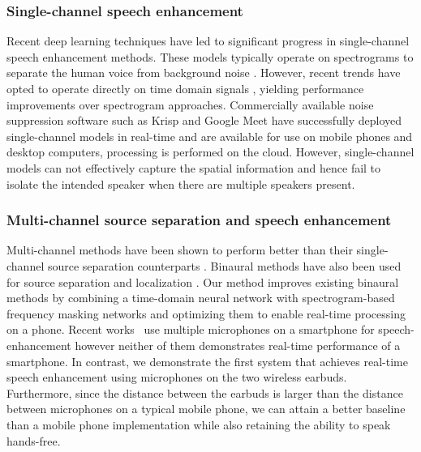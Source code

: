 \documentclass [11pt, proquest] {uwthesis}[2020/02/24]
\begin{document}
\subsubsection{Single-channel speech enhancement}
Recent deep learning techniques have led to significant progress in single-channel speech enhancement methods. These models typically operate on spectrograms to separate the human voice from background noise \cite{realtimenoise, Mohammadiha_2013, online_nonnegative, nikzad2020deep, choi2019phaseaware, lstm_speechenhancement, fu2019metricgan, TFMasking}. However, recent trends have opted to operate directly on time domain signals \cite{luo2019conv, germain2018speech, pascual2017segan, demucsreal, macartney2018improved}, yielding performance improvements over spectrogram approaches. Commercially available noise suppression software such as Krisp \cite{krisp} and Google Meet \cite{googlemeet} have successfully deployed single-channel models in real-time and are available for use on mobile phones and desktop computers, processing is performed on the cloud. However, single-channel models can not effectively capture the spatial information and hence fail to isolate the intended speaker when there are multiple speakers present.


\subsubsection{Multi-channel source separation and speech enhancement}
Multi-channel methods have been shown to perform better than their single-channel source separation counterparts \cite{yoshioka2018multi, chen2018multi, zhang2017deep, gu2020enhancing, tzirakis2021multichannel, jenrungrot2020cone}. Binaural methods have also been used for source separation \cite{binaural1, han2020realtime, li2011two, reindl2010speech} and localization \cite{van2008binaural, lyon1983computational, kock1950binaural}. Our method improves existing binaural methods by combining a time-domain neural network with spectrogram-based frequency masking networks and optimizing them to enable real-time processing on a phone. Recent works~\cite{binaural_osu, dual_phone} use multiple microphones on a smartphone for  speech-enhancement however neither of them demonstrates real-time performance of a smartphone. In contrast, we demonstrate the first system that achieves real-time speech enhancement using microphones on the two wireless earbuds. Furthermore, since the distance between the earbuds is larger than the distance between microphones on a typical mobile phone, we can attain a better baseline than a mobile phone implementation while also retaining the ability to speak hands-free.
\end{document}
